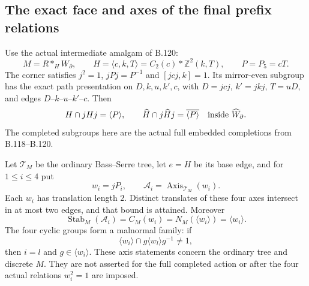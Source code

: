 \subsection*{The exact face and axes of the final prefix relations}
\label{stmt:B126}
Use the actual intermediate amalgam of B.120:
\[
 M=R*_{H}W_\partial,
 \qquad H=\langle c,k,T\rangle=C_2(c)*\mathbb Z^2(k,T),
 \qquad P=P_5=cT.
\]
The corner satisfies $j^2=1$, $jPj=P^{-1}$ and
$[jcj,k]=1$. Its mirror-even subgroup has the exact path
presentation on $D,k,u,k',c$, with $D=jcj$, $k'=jkj$,
$T=uD$, and edges $D$--$k$--$u$--$k'$--$c$.
Then
\begin{equation}\label{eq:B126-corner-face}
 H\cap jHj=\langle P\rangle,
 \qquad
 \widehat H\cap j\widehat H j
      =\overline{\langle P\rangle}
       \quad\hbox{inside }\widehat W_\partial.
\end{equation}
The completed subgroups here are the actual full embedded completions
from B.118--B.120.

Let $\mathcal T_M$ be the ordinary Bass--Serre tree, let $e=H$
be its base edge, and for $1\leq i\leq4$ put
\[
 w_i=jP_i,\qquad \mathcal A_i=\operatorname{Axis}_{\mathcal T_M}(w_i).
\]
Each $w_i$ has translation length $2$. Distinct translates of
these four axes intersect in at most two edges, and that bound
is attained. Moreover
\begin{equation}\label{eq:B126-axis-stabilizers}
 \operatorname{Stab}_M(\mathcal A_i)
  =C_M(w_i)=N_M(\langle w_i\rangle)=\langle w_i\rangle.
\end{equation}
The four cyclic groups form a malnormal family: if
\[
 \langle w_i\rangle\cap g\langle w_l\rangle g^{-1}\ne1,
\]
then $i=l$ and $g\in\langle w_i\rangle$.
These axis statements concern the ordinary tree and discrete $M$.
They are not asserted for the full completed action or after the
four actual relations $w_i^2=1$ are imposed.

